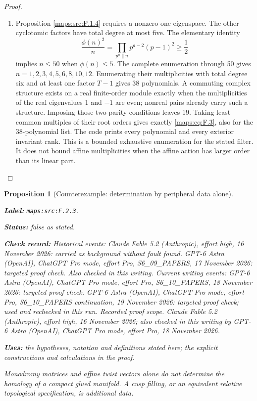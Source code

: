 \documentclass[11pt,a4paper]{article}
\newtheorem{proposition}[proposition]{Proposition}
\theoremstyle{definition}
\newcommand{\StatementRecord}[4]{\par\smallskip\begingroup\upshape\raggedright\noindent\textbf{Label:} \nolinkurl{#1}.\par\noindent\textbf{Status:} #2.\par\noindent\textbf{Check record:} #3.\par\noindent\textbf{Uses:} #4.\par\endgroup\smallskip}
\begin{document}
\begin{proof}
\begin{enumerate}[label=\arabic*.]
\item Proposition \ref{maps:src:F.1.4} requires a nonzero one-eigenspace.  The other
cyclotomic factors have total degree at most five.  The elementary
identity
\[
 \frac{\phi(n)^2}{n}=
 \prod_{p^a\parallel n}p^{a-2}(p-1)^2\geq\frac12
\]
implies $n\leq50$ when $\phi(n)\leq5$.
The complete enumeration through 50 gives
$n=1,2,3,4,5,6,8,10,12$.  Enumerating their multiplicities
with total degree six and at least one factor $T-1$ gives 38
polynomials.  A commuting complex structure exists on a real
finite-order module exactly when the multiplicities of the
real eigenvalues $1$ and $-1$ are even; nonreal pairs already
carry such a structure.  Imposing those two parity conditions
leaves 19.  Taking least common multiples of their root orders
gives exactly \eqref{maps:eq:F.3}, also for the 38-polynomial list.
The code prints every polynomial and every exterior invariant
rank.  This is a bounded exhaustive enumeration for the
stated filter.  It does not bound affine multiplicities when
the affine action has larger order than its linear part.

\end{enumerate}
\end{proof}




\begin{proposition}[Counterexample: determination by peripheral data alone]\label{maps:src:F.2.3}
\StatementRecord{maps:src:F.2.3}{false as stated}{Historical events: Claude Fable 5.2 (Anthropic), effort high, 16 November 2026: carried as background without fault found. GPT-6 Astra (OpenAI), ChatGPT Pro mode, effort Pro, S6\_09\_PAPERS, 17 November 2026: targeted proof check. Also checked in this writing. Current writing events: GPT-6 Astra (OpenAI), ChatGPT Pro mode, effort Pro, S6\_10\_PAPERS, 18 November 2026: targeted proof check. GPT-6 Astra (OpenAI), ChatGPT Pro mode, effort Pro, S6\_10\_PAPERS continuation, 19 November 2026: targeted proof check; used and rechecked in this run. \emph{Recorded proof scope.} Claude Fable 5.2 (Anthropic), effort high, 16 November 2026; also checked in this writing by GPT-6 Astra (OpenAI), ChatGPT Pro mode, effort Pro, 18 November 2026}{the hypotheses, notation and definitions stated here; the explicit constructions and calculations in the proof}


Monodromy matrices and affine twist vectors alone do not
determine the homology of a compact glued manifold.  A cusp
filling, or an equivalent relative topological specification,
is additional data.

\end{proposition}
\end{document}
